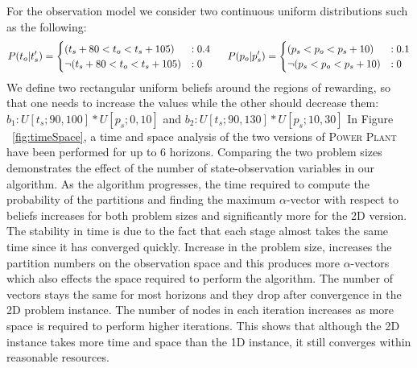 \documentclass{article} %
\begin{document}
For the observation model we consider two continuous uniform distributions such as the following:  
{\footnotesize
\begin{align}
P(t_o|t_s') = 
\begin{cases}
(t_s + 80<t_o<t_s+ 105) &: 0.4 \\
 \neg (t_s + 80<t_o<t_s+ 105) &: 0 \\
\end{cases}\nonumber
\hspace{5mm} 
P(p_o|p_s') = 
\begin{cases}
(p_s<p_o<p_s+10) &: 0.1 \\
 \neg(p_s<p_o<p_s+10) &: 0 \\
\end{cases}\nonumber
\end{align}
}
We define two rectangular uniform beliefs around the regions of rewarding, so that one needs to increase the values while the other should decrease them: $b_1: U[t_s;90,100]*U[p_s;0,10]$ and $b_2: U[t_s;90,130]*U[p_s;10,30]$
In Figure ~\ref{fig:timeSpace}, a time and space analysis of
the two versions of \textsc{Power Plant} have been performed for up to 6 horizons. Comparing the two problem sizes demonstrates the effect of the number of state-observation variables in our algorithm. As the algorithm progresses, the time required to compute the probability of the partitions and finding the maximum $\alpha$-vector with respect to beliefs increases for both problem sizes and significantly more for the 2D version. The stability in time is due to the fact that each stage almost takes the same time since it has converged quickly.%
Increase in the problem size, increases the partition numbers on the observation space and this produces more $\alpha$-vectors which also effects the space required to perform the algorithm. The number of vectors stays the same for most horizons and they drop after convergence in the 2D problem instance. The number of nodes in each iteration increases as more space is required to perform higher iterations. This shows that although the 2D instance takes more time and space than the 1D instance, it still converges within reasonable resources.
\end{document}
